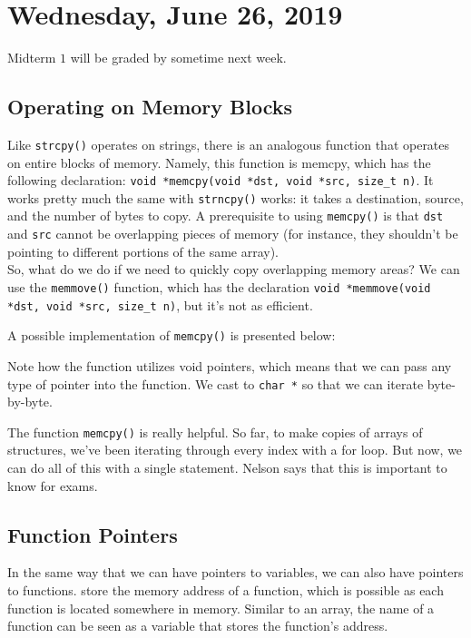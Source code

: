 \section{Wednesday, June 26, 2019}

Midterm $1$ will be graded by sometime next week. 

\subsection{Operating on Memory Blocks}
Like \verb!strcpy()! operates on strings, there is an analogous function that operates on entire blocks of memory. Namely, this function is memcpy, which has the following declaration: \verb!void *memcpy(void *dst, void *src, size_t n)!. It works pretty much the same with \verb!strncpy()! works: it takes a destination, source, and the number of bytes to copy. A prerequisite to using \verb!memcpy()! is that \verb!dst! and \verb!src! cannot be overlapping pieces of memory (for instance, they shouldn't be pointing to different portions of the same array).  \\

So, what do we do if we need to quickly copy overlapping memory areas? We can use the \verb!memmove()! function, which has the declaration \verb!void *memmove(void *dst, void *src, size_t n)!, but it's not as efficient. 


A possible implementation of \verb!memcpy()! is presented below:

 \lstset{
    caption=Memset and Memcpy}
    \begin{center}
    \label{Memset and Memcpy}
    \end{center}
    
Note how the function utilizes void pointers, which means that we can pass any type of pointer into the function. We cast to \verb!char *! so that we can iterate byte-by-byte.


The function \verb!memcpy()! is really helpful. So far, to make copies of arrays of structures, we've been iterating through every index with a for loop. But now, we can do all of this with a single statement. Nelson says that this is important to know for exams. \\



\subsection{Function Pointers}
In the same way that we can have pointers to variables, we can also have pointers to functions.  store the memory address of a function, which is possible as each function is located somewhere in memory. Similar to an array, the name of a function can be seen as a variable that stores the function's address. \\

